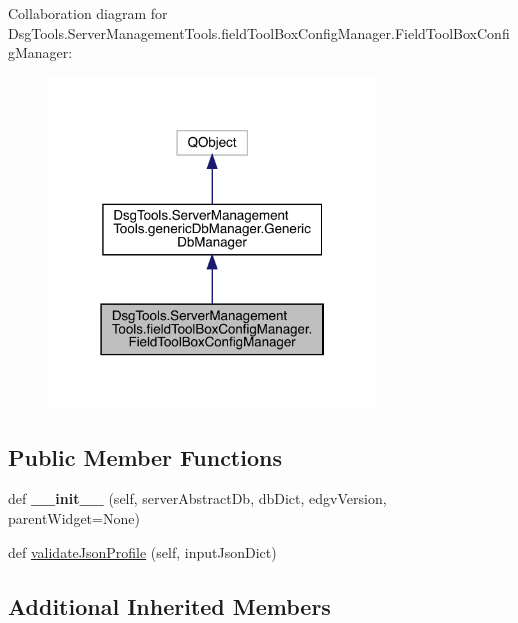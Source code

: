 Collaboration diagram for Dsg\+Tools.\+Server\+Management\+Tools.\+field\+Tool\+Box\+Config\+Manager.\+Field\+Tool\+Box\+Config\+Manager\+:
\nopagebreak
\begin{figure}[H]
\begin{center}
\leavevmode
\includegraphics[width=247pt]{class_dsg_tools_1_1_server_management_tools_1_1field_tool_box_config_manager_1_1_field_tool_box_config_manager__coll__graph}
\end{center}
\end{figure}
\subsection*{Public Member Functions}
\begin{DoxyCompactItemize}
\item 
\mbox{\label{class_dsg_tools_1_1_server_management_tools_1_1field_tool_box_config_manager_1_1_field_tool_box_config_manager_a439a3d6206ec4593437e9da09f37cbc4}} 
def {\bfseries \+\_\+\+\_\+init\+\_\+\+\_\+} (self, server\+Abstract\+Db, db\+Dict, edgv\+Version, parent\+Widget=None)
\item 
def \mbox{\hyperlink{class_dsg_tools_1_1_server_management_tools_1_1field_tool_box_config_manager_1_1_field_tool_box_config_manager_a99e6efddd38d57edbe49c49e1d2d409e}{validate\+Json\+Profile}} (self, input\+Json\+Dict)
\end{DoxyCompactItemize}
\subsection*{Additional Inherited Members}


